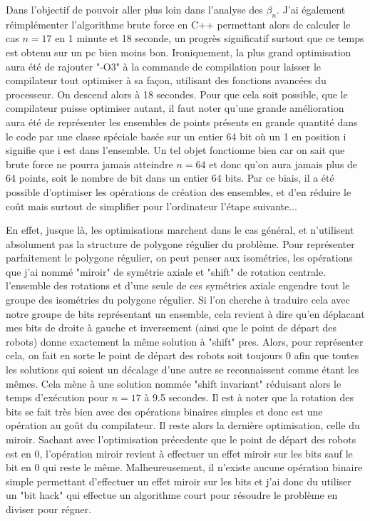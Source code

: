 Dans l'objectif de pouvoir aller plus loin dans l'analyse des $\beta_n$. J'ai également réimplémenter l'algorithme brute force en C++ permettant alors de calculer le cas $n = 17$ en 1 minute et 18 seconde, un progrès significatif surtout que ce temps est obtenu sur un pc bien moins bon.
Ironiquement, la plus grand optimisation aura été de rajouter "-O3" à la commande de compilation pour laisser le compilateur tout optimiser à sa façon, utilisant des fonctions avancées du processeur. On descend alors à 18 secondes.
Pour que cela soit possible, que le compilateur puisse optimiser autant, il faut noter qu'une grande amélioration aura été de représenter les ensembles de points présents en grande quantité dans le code par une classe spéciale basée sur un entier 64 bit où un 1 en position i signifie que i est dans l'ensemble. Un tel objet fonctionne bien car on sait que brute force ne pourra jamais atteindre $n = 64$ et donc qu'on aura jamais plus de 64 points, soit le nombre de bit dans un entier 64 bits. Par ce biais, il a été possible d'optimiser les opérations de création des ensembles, et d'en réduire le coût mais surtout de simplifier pour l'ordinateur l'étape suivante...

En effet, jusque là, les optimisations marchent dans le cas général, et n'utilisent absolument pas la structure de polygone régulier du problème. Pour représenter parfaitement le polygone régulier, on peut penser aux isométries, les opérations que j'ai nommé "miroir" de symétrie axiale et "shift" de rotation centrale. l'ensemble des rotations et d'une seule de ces symétries axiale engendre tout le groupe des isométries du polygone régulier. 
Si l'on cherche à traduire cela avec notre groupe de bits représentant un ensemble, cela revient à dire qu'en déplacant mes bits de droite à gauche et inversement (ainsi que le point de départ des robots) donne exactement la même solution à "shift" pres.
Alors, pour représenter cela, on fait en sorte le point de départ des robots soit toujours 0 afin que toutes les solutions qui soient un décalage d'une autre se reconnaissent comme étant les mêmes. Cela mène à une solution nommée "shift invariant" réduisant alors le temps d'exécution pour $n = 17$ à 9.5 secondes. Il est à noter que la rotation des bits se fait très bien avec des opérations binaires simples et donc est une opération au goût du compilateur.
Il reste alors la dernière optimisation, celle du miroir. Sachant avec l'optimisation précedente que le point de départ des robots est en 0, l'opération miroir revient à effectuer un effet miroir sur les bits sauf le bit en 0 qui reste le même. 
Malheureusement, il n'existe aucune opération binaire simple permettant d'effectuer un effet miroir sur les bits et j'ai donc du utiliser un "bit hack" qui effectue un algorithme court pour résoudre le problème en diviser pour régner.

